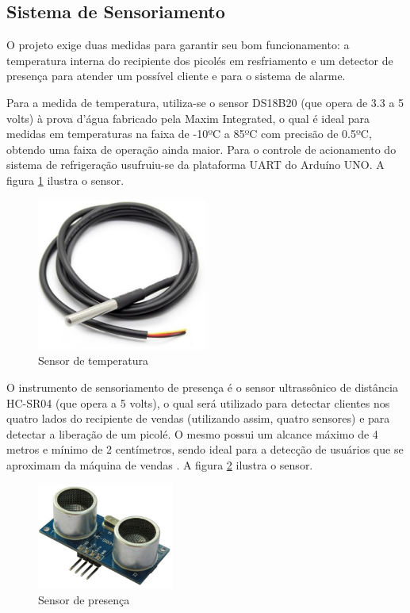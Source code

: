 \subsection{Sistema de Sensoriamento}

O projeto exige duas medidas para garantir seu bom funcionamento: a temperatura interna do recipiente dos picolés em resfriamento e um detector de presença para atender um possível cliente e para o sistema de alarme.

	Para a medida de temperatura, utiliza-se o sensor DS18B20 (que opera de 3.3 a 5 volts) à prova d'água fabricado pela Maxim Integrated, o qual é ideal para medidas em temperaturas na faixa de -10ºC a 85ºC com precisão de 0.5ºC, obtendo uma faixa de operação ainda maior. Para o controle de acionamento do sistema de refrigeração usufruiu-se da plataforma UART do Arduíno UNO. A figura \ref{fig:sensor_temperatura} ilustra o sensor.

\begin{figure}[H]
	\centering
    \includegraphics[width=0.5\textwidth]{figuras/sensor_temperatura}
    \caption{Sensor de temperatura}
    \label{fig:sensor_temperatura}
\end{figure}

O instrumento de sensoriamento de presença é o sensor ultrassônico de distância HC-SR04 (que opera a 5 volts), o qual será utilizado para detectar clientes nos quatro lados do recipiente de vendas (utilizando assim, quatro sensores) e para detectar a liberação de um picolé. O mesmo possui um alcance máximo de 4 metros e mínimo de 2 centímetros, sendo ideal para a detecção de usuários que se aproximam da máquina de vendas \cite{mq3}. A figura \ref{fig:sensor_presenca} ilustra o sensor.

\begin{figure}[H]
	\centering
    \includegraphics[width=0.4\textwidth]{figuras/sensor_presenca}
    \caption{Sensor de presença}
    \label{fig:sensor_presenca}
\end{figure}

